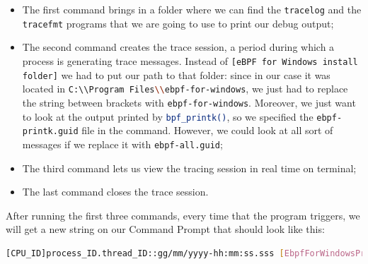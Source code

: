 \begin{itemize}
	\item 
		The first command brings in a folder where we can find the \colorbox{backcolour}{\lstinline[style=commandline, language=bash, breaklines=true]|tracelog|} and the \colorbox{backcolour}{\lstinline[style=commandline, language=bash, breaklines=true]|tracefmt|} programs that we are going to use to print our debug output;
	\item 
		The second command creates the trace session, a period during which a process is generating trace messages.
		Instead of \colorbox{backcolour}{\lstinline[style=commandline, language=bash, breaklines=true]|[eBPF for Windows install folder]|} we had to put our path to that folder: since in our case it was located in \colorbox{backcolour}{\lstinline[style=commandline, language=bash, breaklines=true]|C:\\Program Files\\ebpf-for-windows|}, we just had to replace the string between brackets with \colorbox{backcolour}{\lstinline[style=commandline, language=bash, breaklines=true]|ebpf-for-windows|}.
		Moreover, we just want to look at the output printed by \colorbox{backcolour}{\lstinline[style=commandline, language=bash, breaklines=true]|bpf_printk()|}, so we specified the \colorbox{backcolour}{\lstinline[style=commandline, language=bash, breaklines=true]|ebpf-printk.guid|} file in the command.
		However, we could look at all sort of messages if we replace it with \colorbox{backcolour}{\lstinline[style=commandline, language=bash, breaklines=true]|ebpf-all.guid|};
	\item 
		The third command lets us view the tracing session in real time on terminal;
	\item 
		The last command closes the trace session.
\end{itemize}

After running the first three commands, every time that the program triggers, we will get a new string on our Command Prompt that should look like this:

\begin{lstlisting}[style=commandline, language=bash, caption={Real-time output messages format using \colorbox{backcolour}{\lstinline[style=commandline, language=bash]|tracelog|} and \colorbox{backcolour}{\lstinline[style=commandline, language=bash]|tracefmt|}.}]
	[CPU_ID]process_ID.thread_ID::gg/mm/yyyy-hh:mm:ss.sss [EbpfForWindowsProvider]{"Message":"Hello World x!"}
\end{lstlisting}

